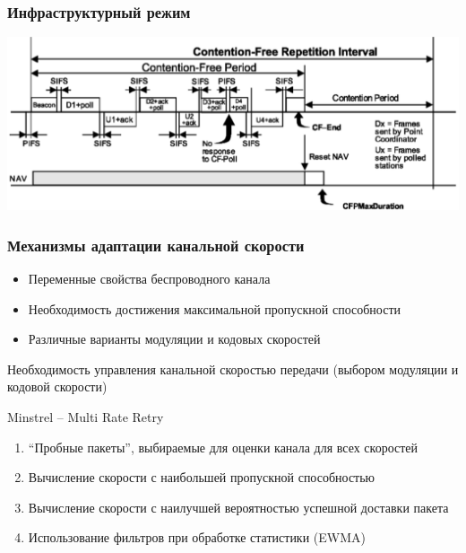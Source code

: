 \documentclass[utf8]{beamer}
\begin{document}
\begin{frame}
\frametitle{Инфраструктурный режим}
\begin{center}
 \includegraphics[width=\textwidth]{pic/pcf.png}
\end{center}
\end{frame}
\begin{frame}
\frametitle{Механизмы адаптации канальной скорости}
\begin{itemize}
 \item Переменные свойства беспроводного канала
 \item Необходимость достижения максимальной пропускной способности
 \item Различные варианты модуляции и кодовых скоростей
\end{itemize}
Необходимость управления канальной скоростью передачи (выбором модуляции и кодовой скорости)
\begin{block}{Minstrel -- Multi Rate Retry}
\begin{enumerate}
 \item ``Пробные пакеты'', выбираемые для оценки канала для всех скоростей
 \item Вычисление скорости с наибольшей пропускной способностью
 \item Вычисление скорости с наилучшей вероятностью успешной доставки пакета
 \item Использование фильтров при обработке статистики (EWMA)
\end{enumerate}
\end{block}
\end{frame}
\end{document}
